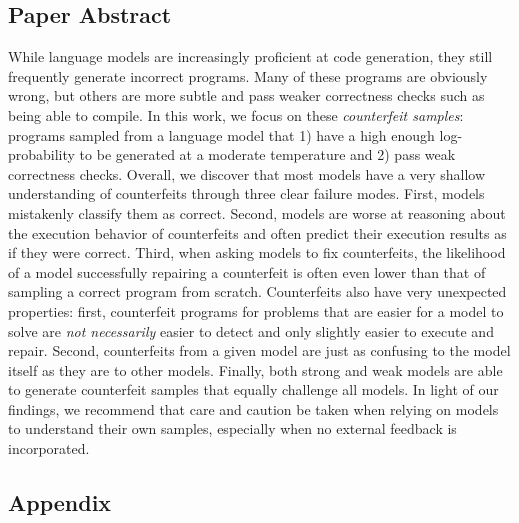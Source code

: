 \subsection*{Paper Abstract}
While language models are increasingly proficient at code generation, they still frequently generate incorrect programs. Many of these programs are obviously wrong, but others are more subtle and pass weaker correctness checks such as being able to compile. In this work, we focus on these \textit{counterfeit samples}: programs sampled from a language model that 1) have a high enough log-probability to be generated at a moderate temperature and 2) pass weak correctness checks. Overall, we discover that most models have a very shallow understanding of counterfeits through three clear failure modes. First, models mistakenly classify them as correct. Second, models are worse at reasoning about the execution behavior of counterfeits and often predict their execution results as if they were correct. Third, when asking models to fix counterfeits, the likelihood of a model successfully repairing a counterfeit is often even lower than that of sampling a correct program from scratch. Counterfeits also have very unexpected properties: first, counterfeit programs for problems that are easier for a model to solve are \textit{not necessarily} easier to detect and only slightly easier to execute and repair. Second, counterfeits from a given model are just as confusing to the model itself as they are to other models. Finally, both strong and weak models are able to generate counterfeit samples that equally challenge all models. In light of our findings, we recommend that care and caution be taken when relying on models to understand their own samples, especially when no external feedback is incorporated.











\subsection{Appendix}





